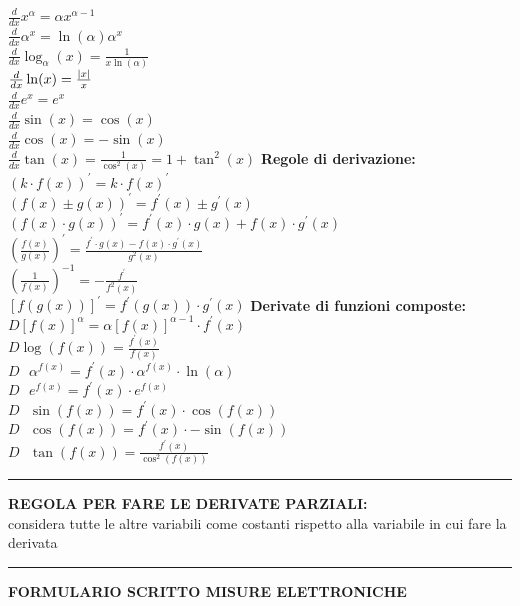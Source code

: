 \documentclass{article}
\begin{document}
\begin{multicols*}{3}
    $\frac{d}{dx} x^{\alpha} = \alpha x ^{\alpha -1}$\\
    $\frac{d}{dx} \alpha ^{x} = \ln(\alpha) \alpha^{x} $ \\
    $\frac{d}{dx} \log_{\alpha} (x) = \frac{1}{x \ln(\alpha)} $ \\
    $\frac{d}{dx} \ln(x) = \frac{\abs{x}}{x} $ \\
    $\frac{d}{dx} e^{x} = e^{x} $ \\
    $\frac{d}{dx} \sin(x) = \cos(x)$ \\
    $\frac{d}{dx} \cos(x) = - \sin(x)$ \\
    $\frac{d}{dx} \tan(x) = \frac{1}{\cos^{2} (x)} = 1 + \tan^{2} (x)$ \newline
    \textbf{Regole di derivazione:} \\ 
    $(k \cdot f(x))^{'} = k \cdot f(x)^{'}$ \\ 
   $(f(x) \pm g(x))^{'} = f^{'} (x) \pm g^{'} (x)$ \\ 
   $(f(x) \cdot g(x) )^{'} = f^{'} (x) \cdot g(x) + f(x) \cdot g^{'} (x)$ \\ 
    $(\frac{f(x)}{g(x)})^{'} = \frac{f^{'} \cdot g(x) - f(x) \cdot g^{'} (x)}{g^{2} (x)}$ \\ 
    $(\frac{1}{f(x)})^{-1} = - \frac{f^{'}}{f^{2} (x)}$ \\ 
    $[f(g(x))]^{'} = f^{'} (g(x)) \cdot g^{'} (x)$ \newline
    \textbf{Derivate di funzioni composte:} \\
    $D[f(x)]^{\alpha} = \alpha [f(x)]^{\alpha -1} \cdot f^{'} (x)$\\
    $D \log(f(x)) = \frac{f^{'} (x)}{f(x)}$ \\
    $D \text{ } \alpha^{f(x)} = f^{'} (x) \cdot \alpha ^{f(x)} \cdot \ln(\alpha)$ \\
    $D \text{ } e^{f(x)} = f^{'} (x) \cdot e^{f(x)} $ \\
    $D  \text{ } \sin(f(x)) = f^{'} (x) \cdot \cos(f(x)) $ \\
    $D  \text{ } \cos(f(x)) = f^{'} (x) \cdot - \sin(f(x)) $ \\
    $D  \text{ } \tan(f(x)) = \frac{f^{'} (x)}{\cos^{2} (f(x))}$ \newline
    \hrule 
    \textbf{REGOLA PER FARE LE DERIVATE PARZIALI:} \\
    considera tutte le altre variabili come costanti rispetto alla variabile in cui fare la derivata \newline 
    \hrule 
    \textbf{FORMULARIO SCRITTO MISURE ELETTRONICHE } \newline
\end{multicols*}
\end{document}
